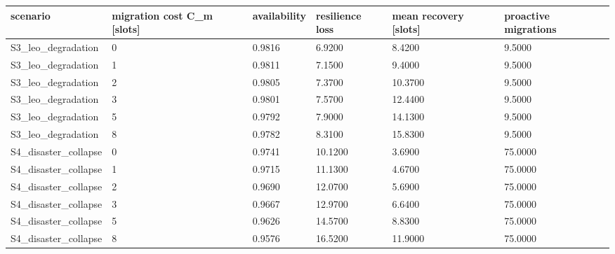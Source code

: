 \begin{tabular}{llllll}
\toprule
scenario & migration cost C\_m [slots] & availability & resilience loss & mean recovery [slots] & proactive migrations \\
\midrule
S3\_leo\_degradation & 0 & 0.9816 & 6.9200 & 8.4200 & 9.5000 \\
S3\_leo\_degradation & 1 & 0.9811 & 7.1500 & 9.4000 & 9.5000 \\
S3\_leo\_degradation & 2 & 0.9805 & 7.3700 & 10.3700 & 9.5000 \\
S3\_leo\_degradation & 3 & 0.9801 & 7.5700 & 12.4400 & 9.5000 \\
S3\_leo\_degradation & 5 & 0.9792 & 7.9000 & 14.1300 & 9.5000 \\
S3\_leo\_degradation & 8 & 0.9782 & 8.3100 & 15.8300 & 9.5000 \\
S4\_disaster\_collapse & 0 & 0.9741 & 10.1200 & 3.6900 & 75.0000 \\
S4\_disaster\_collapse & 1 & 0.9715 & 11.1300 & 4.6700 & 75.0000 \\
S4\_disaster\_collapse & 2 & 0.9690 & 12.0700 & 5.6900 & 75.0000 \\
S4\_disaster\_collapse & 3 & 0.9667 & 12.9700 & 6.6400 & 75.0000 \\
S4\_disaster\_collapse & 5 & 0.9626 & 14.5700 & 8.8300 & 75.0000 \\
S4\_disaster\_collapse & 8 & 0.9576 & 16.5200 & 11.9000 & 75.0000 \\
\bottomrule
\end{tabular}
